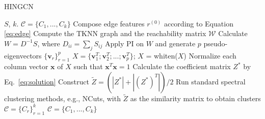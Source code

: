 \begin{algorithm}
\begin{small}
\caption{HINGCN}
\label{alg}
\begin{algorithmic}[1]
\Require $S$, $k$.
\Ensure $\mathcal{C} = \{C_1, ..., C_k\}$
\State Compose edge features $r^{(0)}$ according to Equation \ref{eq:edge}
\State Compute the TKNN graph and the reachability matrix $\mathcal{W}$
\State Calculate $W = D^{-1}S$, where $D_{ii} = \sum_jS_{ij}$
\State Apply PI on $W$ and generate $p$ pseudo-eigenvectors $\{\bm{v}_r\}_{r=1}^p$
\State $X = \{\bm{v}_1^T; \bm{v}_2^T; ...; \bm{v}_p^T\}$; $X$ = whiten($X$)
\State Normalize each column vector $\bm{x}$ of $X$ such that $\bm{x}^T\bm{x} = 1$
\State Calculate the coefficient matrix $Z^*$ by Eq.~\ref{eq:solution}
\State Construct $\tilde{Z} = (|Z^*| + |(Z^*)^T|)/2$
\State Run standard spectral clustering methods, e.g., NCuts, with $\tilde{Z}$ as the
similarity matrix to obtain clusters $\mathcal{C} = \{C_r\}_{r=1}^k$
\State \Return $\mathcal{C} = \{C_1, ..., C_k\}$
\end{algorithmic}
\end{small}
\end{algorithm}









